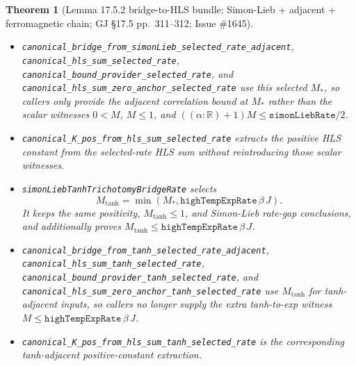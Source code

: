 \documentclass[a4paper,11pt]{article}
\newtheorem{theorem}{Theorem}
\begin{document}
\begin{theorem}[Lemma 17.5.2 bridge-to-HLS bundle: Simon-Lieb + adjacent + ferromagnetic chain;
GJ \S17.5 pp.~311--312; Issue \#1645]
\begin{itemize}
\[        \frac{\texttt{simonLiebRate}\,\beta\,J\,d/2}{(\alpha:\mathbb{R})+1}
      \right).
    \]
    In the strict high-temperature regime it proves
    $0 < M_\ast$, $M_\ast \le 1$, and
    $((\alpha:\mathbb{R})+1)M_\ast \le
      \texttt{simonLiebRate}\,\beta\,J\,d/2$.
  \item \texttt{canonical\_bridge\_from\_simonLieb\_selected\_rate\_adjacent},
    \texttt{canonical\_hls\_sum\_selected\_rate},
    \texttt{canonical\_bound\_provider\_selected\_rate}, and
    \texttt{canonical\_hls\_sum\_zero\_anchor\_selected\_rate} use this
    selected $M_\ast$, so callers only provide the adjacent correlation bound
    at $M_\ast$ rather than the scalar witnesses
    $0 < M$, $M \le 1$, and
    $((\alpha:\mathbb{R})+1)M \le \texttt{simonLiebRate}/2$.
  \item \texttt{canonical\_K\_pos\_from\_hls\_sum\_selected\_rate}
    extracts the positive HLS constant from the selected-rate HLS sum without
    reintroducing those scalar witnesses.
  \item \texttt{simonLiebTanhTrichotomyBridgeRate} selects
    \[
      M_{\tanh} = \min(M_\ast,\texttt{highTempExpRate}\,\beta\,J).
    \]
    It keeps the same positivity, $M_{\tanh} \le 1$, and Simon-Lieb
    rate-gap conclusions, and additionally proves
    $M_{\tanh} \le \texttt{highTempExpRate}\,\beta\,J$.
  \item \texttt{canonical\_bridge\_from\_tanh\_selected\_rate\_adjacent},
    \texttt{canonical\_hls\_sum\_tanh\_selected\_rate},
    \texttt{canonical\_bound\_provider\_tanh\_selected\_rate}, and
    \texttt{canonical\_hls\_sum\_zero\_anchor\_tanh\_selected\_rate} use
    $M_{\tanh}$ for tanh-adjacent inputs, so callers no longer supply
    the extra tanh-to-exp witness
    $M \le \texttt{highTempExpRate}\,\beta\,J$.
  \item \texttt{canonical\_K\_pos\_from\_hls\_sum\_tanh\_selected\_rate}
    is the corresponding tanh-adjacent positive-constant extraction.
\end{itemize}
\end{theorem}
\end{document}
